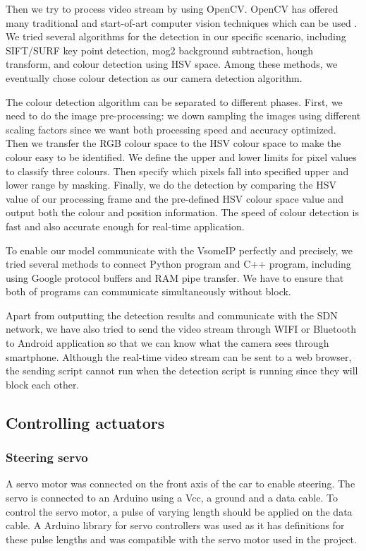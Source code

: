 \documentclass[11pt, titlepage]{article} %
\begin{document}
Then we try to process video stream by using OpenCV. OpenCV has offered many traditional and start-of-art computer vision techniques which can be used . We tried several algorithms for the detection in our specific scenario, including SIFT/SURF key point detection, mog2 background subtraction, hough transform, and colour detection using HSV space. Among these methods, we eventually chose colour detection as our camera detection algorithm.

The colour detection algorithm can be separated to different phases. First, we need to do the image pre-processing: we down sampling the images using different scaling factors since we want both processing speed and accuracy optimized. Then we transfer the RGB colour space to the HSV colour space to make the colour easy to be identified. We define the upper and lower limits for pixel values to classify three colours. Then specify which pixels fall into specified upper and lower range by masking. Finally, we do the detection by comparing the HSV value of our processing frame and the pre-defined HSV colour space value and output both the colour and position information. The speed of colour detection is fast and also accurate enough for real-time application.

To enable our model communicate with the VsomeIP perfectly and precisely, we tried several methods to connect Python program and C++ program, including using Google protocol buffers and RAM pipe transfer. We have to ensure that both of programs can communicate simultaneously without block. 

Apart from outputting the detection results and communicate with the SDN network, we have also tried to send the video stream through WIFI or Bluetooth to Android application so that we can know what the camera sees through smartphone. Although the real-time video stream can be sent to a web browser, the sending script cannot run when the detection script is running since they will block each other.


\subsection{Controlling actuators}
\subsubsection{Steering servo}
A servo motor was connected on the front axis of the car to enable steering. The servo is connected to an Arduino using a Vcc, a ground and a data cable. To control the servo motor, a pulse of varying length should be applied on the data cable. A Arduino library for servo controllers was used as it has definitions for these pulse lengths and was compatible with the servo motor used in the project.
\end{document}

